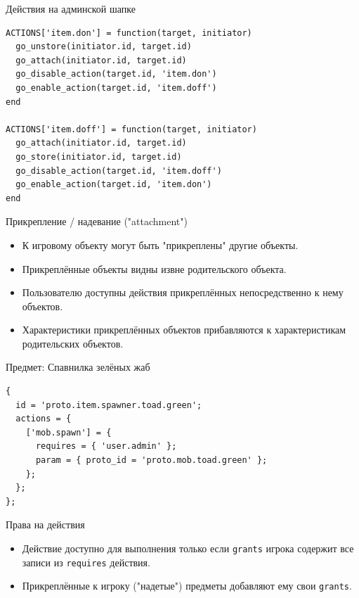 \documentclass[aspectratio=169,handout,bigger]{beamer}
\begin{document}

\begin{frame}[fragile]{Действия на админской шапке}
\begin{verbatim}
ACTIONS['item.don'] = function(target, initiator)
  go_unstore(initiator.id, target.id)
  go_attach(initiator.id, target.id)
  go_disable_action(target.id, 'item.don')
  go_enable_action(target.id, 'item.doff')
end

ACTIONS['item.doff'] = function(target, initiator)
  go_attach(initiator.id, target.id)
  go_store(initiator.id, target.id)
  go_disable_action(target.id, 'item.doff')
  go_enable_action(target.id, 'item.don')
end
\end{verbatim}
\end{frame}


\begin{frame}{Прикрепление / надевание ("attachment")}
  \begin{itemize}
    \item К игровому объекту могут быть "прикреплены" другие объекты.
    \item Прикреплённые объекты видны извне родительского объекта.
    \item Пользователю доступны действия
          прикреплённых непосредственно к нему объектов.
    \item Характеристики прикреплённых объектов прибавляются
          к характеристикам родительских объектов.
  \end{itemize}
\end{frame}


\begin{frame}[fragile]{Предмет: Спавнилка зелёных жаб}
\begin{verbatim}
{
  id = 'proto.item.spawner.toad.green';
  actions = {
    ['mob.spawn'] = {
      requires = { 'user.admin' };
      param = { proto_id = 'proto.mob.toad.green' };
    };
  };
};
\end{verbatim}
\end{frame}


\begin{frame}{Права на действия}
  \begin{itemize}
    \item Действие доступно для выполнения только если \texttt{grants} игрока
          содержит все записи из \texttt{requires} действия.
    \item Прикреплённые к игроку ("надетые") предметы
          добавляют ему свои \texttt{grants}.
  \end{itemize}
\end{frame}
\end{document}
